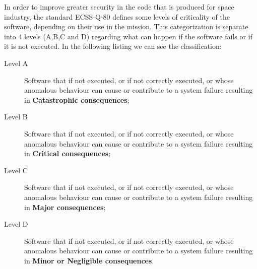 {In order to improve greater security in the code that is produced for space industry, the standard ECSS-Q-80\cite{ecss-q-st-80c} defines
some levels of criticality of the software, depending on their use in the mission.
This categorization is separate into 4 levels (A,B,C and D) regarding what can happen if the software fails or if it is not executed.
In the following listing we can see the classification:

\begin{description}
\item[Level A] Software that if not executed, or if not correctly executed, or whose anomalous behaviour can cause or contribute to a system failure resulting in \textbf{Catastrophic consequences};
\item[Level B] Software that if not executed, or if not correctly executed, or whose anomalous behaviour can cause or contribute to a system failure resulting in \textbf{Critical consequences};
\item[Level C] Software that if not executed, or if not correctly executed, or whose anomalous behaviour can cause or contribute to a system failure resulting in \textbf{Major consequences};
\item[Level D] Software that if not executed, or if not correctly executed, or whose anomalous behaviour can cause or contribute to a system failure resulting in \textbf{Minor or Negligible consequences}.
\end{description}

}
